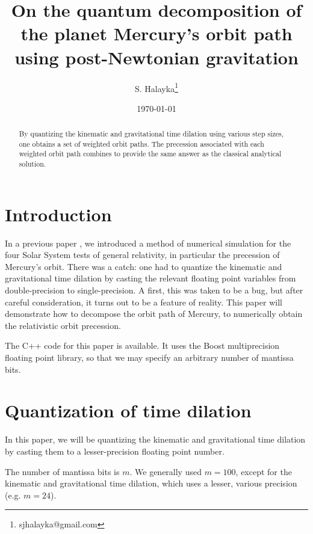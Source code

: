 \documentclass[12pt]{article}
\title{On the quantum decomposition of the planet Mercury's orbit path using post-Newtonian gravitation}
\author{S. Halayka\footnote{sjhalayka@gmail.com}}
\date{\today\;\currenttime}
\begin{document}
 
\maketitle

\begin{abstract}
By quantizing the kinematic and gravitational time dilation using various step sizes, one obtains a set of weighted orbit paths.
The precession associated with each weighted orbit path combines to provide the same answer as the classical analytical solution.
\end{abstract}





\section{Introduction}

In a previous paper \cite{halayka}, we introduced a method of numerical simulation for the four Solar System tests of general relativity, in particular the precession of Mercury's orbit.
There was a catch: one had to quantize the kinematic and gravitational time dilation by casting the relevant floating point variables from double-precision to single-precision.
A first, this was taken to be a bug, but after careful consideration, it turns out to be a feature of reality.
This paper will demonstrate how to decompose the orbit path of Mercury, to numerically obtain the relativistic orbit precession.

The C++ code for this paper is available.
It uses the Boost multiprecision floating point library, so that we may specify an arbitrary number of mantissa bits.


\section{Quantization of time dilation}

In this paper, we will be quantizing the kinematic and gravitational time dilation by casting them to a lesser-precision floating point number.

The number of mantissa bits is $m$.
We generally used $m = 100$, except for the kinematic and gravitational time dilation, which uses a lesser, various precision (e.g. $m = 24$).

\end{document}

